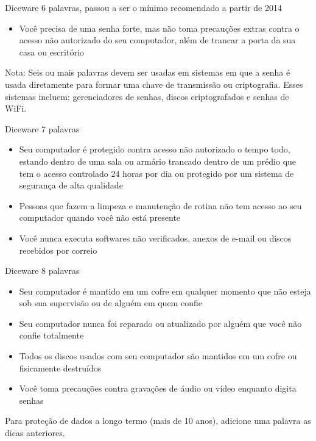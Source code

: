 \begin{frame}{Diceware}
	6 palavras, passou a ser o mínimo recomendado a partir de 2014

	\begin{itemize}
		\item Você precisa de uma senha forte, mas não toma precauções extras contra o acesso não
		      autorizado do seu computador, além de trancar a porta da sua casa ou escritório
	\end{itemize}

	\vfill

	Nota: Seis ou mais palavras devem ser usadas em sistemas em que a senha é usada diretamente
	para formar uma chave de transmissão ou criptografia. Esses sistemas incluem: gerenciadores
	de senhas, discos criptografados e senhas de WiFi.
\end{frame}

\begin{frame}{Diceware}
	7 palavras

	\begin{itemize}
		\item Seu computador é protegido contra acesso não autorizado o tempo todo, estando dentro de
		      uma sala ou armário trancado dentro de um prédio que tem o acesso controlado 24 horas por dia
		      ou protegido por um sistema de segurança de alta qualidade
		\item Pessoas que fazem a limpeza e manutenção de rotina não tem acesso ao seu computador quando
		      você não está presente
		\item Você nunca executa softwares não verificados, anexos de e-mail ou discos recebidos por correio
	\end{itemize}
\end{frame}

\begin{frame}{Diceware}
	8 palavras

	\begin{itemize}
		\item Seu computador é mantido em um cofre em qualquer momento que não esteja sob sua supervisão
		      ou de alguém em quem confie
		\item Seu computador nunca foi reparado ou atualizado por alguém que você não confie totalmente
		\item Todos os discos usados com seu computador são mantidos em um cofre ou fisicamente destruídos
		\item Você toma precauções contra gravações de áudio ou vídeo enquanto digita senhas
	\end{itemize}

	\vfill

	Para proteção de dados a longo termo (mais de 10 anos), adicione uma palavra as dicas anteriores.
\end{frame}

